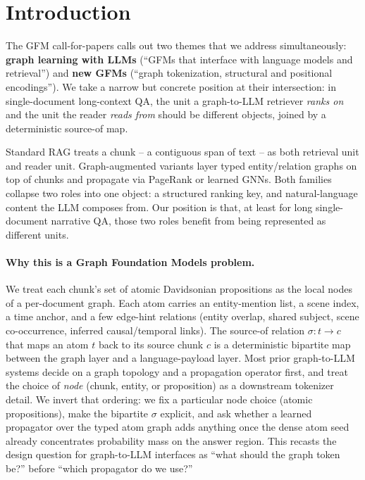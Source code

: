 \documentclass{article}
\theoremstyle{plain}
\theoremstyle{definition}
\theoremstyle{remark}
\begin{document}
\section{Introduction}
\label{sec:intro}

The GFM call-for-papers calls out two themes that we address simultaneously:
\textbf{graph learning with LLMs} (``GFMs that interface with language models
and retrieval'') and \textbf{new GFMs} (``graph tokenization, structural and
positional encodings''). We take a narrow but concrete position at their
intersection: in single-document long-context QA, the unit a graph-to-LLM
retriever \emph{ranks on} and the unit the reader \emph{reads from} should
be different objects, joined by a deterministic source-of map.

Standard RAG \citep{karpukhin2020dpr} treats a chunk -- a contiguous span of
text -- as both retrieval unit and reader unit. Graph-augmented variants
\citep{edge2024graphrag,gutierrez2024hipporag} layer typed entity/relation
graphs on top of chunks and propagate via PageRank or learned GNNs. Both
families collapse two roles into one object: a structured ranking key, and
natural-language content the LLM composes from. Our position is that, at
least for long single-document narrative QA, those two roles benefit from
being represented as different units.

\paragraph{Why this is a Graph Foundation Models problem.}
We treat each chunk's set of atomic Davidsonian propositions
\citep{davidson1967logical} as the local nodes of a per-document graph. Each
atom carries an entity-mention list, a scene index, a time anchor, and a few
edge-hint relations (entity overlap, shared subject, scene co-occurrence,
inferred causal/temporal links). The source-of relation $\sigma:t\!\to\!c$
that maps an atom $t$ back to its source chunk $c$ is a deterministic
bipartite map between the graph layer and a language-payload layer. Most
prior graph-to-LLM systems decide on a graph topology and a propagation
operator first, and treat the choice of \emph{node} (chunk, entity, or
proposition) as a downstream tokenizer detail. We invert that ordering: we
fix a particular node choice (atomic propositions), make the bipartite
$\sigma$ explicit, and ask whether a learned propagator over the typed atom
graph adds anything once the dense atom seed already concentrates probability
mass on the answer region. This recasts the design question for graph-to-LLM
interfaces as ``what should the graph token be?'' before ``which propagator
do we use?''
\end{document}

